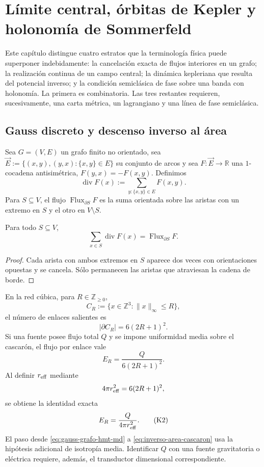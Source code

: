 \chapter{Límite central, órbitas de Kepler y holonomía de Sommerfeld}
\label{chap:limite-central-kepler-sommerfeld}

Este capítulo distingue cuatro estratos que la terminología física puede
superponer indebidamente: la cancelación exacta de flujos interiores en un
grafo; la realización continua de un campo central; la dinámica kepleriana
que resulta del potencial inverso; y la condición semiclásica de fase sobre
una banda con holonomía. La primera es combinatoria. Las tres restantes
requieren, sucesivamente, una carta métrica, un lagrangiano y una línea de
fase semiclásica.

\section{Gauss discreto y descenso inverso al área}
\label{sec:gauss-discreto-limite-central}

Sea \(G=(V,E)\) un grafo finito no orientado, sea
\(\vec E:=\{(x,y),(y,x):\{x,y\}\in E\}\) su conjunto de arcos y sea
\(F:\vec E\to\mathbb R\) una \(1\)-co\-cadena antisimétrica,
\(F(y,x)=-F(x,y)\). Definimos
\[
 \operatorname{div}F(x)
 :=\sum_{y:\{x,y\}\in E}F(x,y).
\]
Para \(S\subseteq V\), el flujo
\(\operatorname{Flux}_{\partial S}F\) es la suma orientada sobre las aristas
con un extremo en \(S\) y el otro en \(V\setminus S\).

\begin{theorem}
\label{thm:gauss-grafo-hmt-md}
Para todo \(S\subseteq V\),
\[
 \sum_{x\in S}\operatorname{div}F(x)
 =\operatorname{Flux}_{\partial S}F.
 \tag{K1}\label{eq:gauss-grafo-hmt-md}
\]
\end{theorem}

\begin{proof}
Cada arista con ambos extremos en \(S\) aparece dos veces con orientaciones
opuestas y se cancela. Sólo permanecen las aristas que atraviesan la cadena
de borde.
\end{proof}

En la red cúbica, para \(R\in\mathbb Z_{\geq0}\),
\[
 C_R:=\{x\in\mathbb Z^3:\|x\|_\infty\leq R\},
\]
el número de enlaces salientes es
\[
 |\partial C_R|=6(2R+1)^2.
\]
Si una fuente posee flujo total \(Q\) y se impone uniformidad media sobre el
cascarón, el flujo por enlace vale
\[
 E_R=\frac{Q}{6(2R+1)^2}.
\]
Al definir \(r_{\rm eff}\) mediante
\[
 4\pi r_{\rm eff}^2=6(2R+1)^2,
\]
se obtiene la identidad exacta
\[
 E_R=\frac{Q}{4\pi r_{\rm eff}^2}.
 \tag{K2}\label{eq:inverso-area-cascaron}
\]
El paso desde \eqref{eq:gauss-grafo-hmt-md} a
\eqref{eq:inverso-area-cascaron} usa la hipótesis adicional de isotropía
media. Identificar \(Q\) con una fuente gravitatoria o eléctrica requiere,
además, el transductor dimensional correspondiente.

